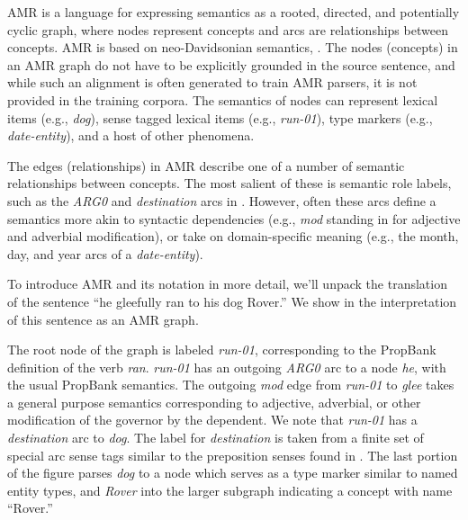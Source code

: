 \documentclass[11pt]{article}
\newcommand\w[1]{\textit{#1}} %
\newcommand\e[1]{\textit{#1}} %
\newcommand\n[1]{\textit{#1}} %
\begin{document}

AMR is a language for expressing semantics as a rooted, directed, and potentially cyclic graph, where nodes represent concepts and arcs are relationships between concepts.
AMR is based on neo-Davidsonian semantics, \cite{Davidson:1967,Parsons:1990}.
The nodes (concepts) in an AMR graph do not have to be explicitly grounded in the source sentence, 
and while such an alignment is often generated to train AMR parsers, it is not provided in the training corpora.
The semantics of nodes can represent lexical items (e.g., \w{dog}), sense tagged lexical items (e.g., \textit{run-01}), type markers (e.g., \textit{date-entity}), and a host of other phenomena.

The edges (relationships) in AMR describe one of a number of semantic relationships between concepts.
The most salient of these is semantic role labels, such as the \w{ARG0} and \w{destination} arcs in .
However, often these arcs define a semantics more akin to syntactic dependencies (e.g., \textit{mod} standing in for adjective and adverbial modification), or take on domain-specific meaning (e.g., the month, day, and year arcs of a \textit{date-entity}).

To introduce AMR and its notation in more detail, we'll unpack the translation of the sentence ``he gleefully ran to his dog Rover.'' 
We show in  the interpretation of this sentence as an AMR graph.


The root node of the graph is labeled \n{run-01}, corresponding to the PropBank \cite{palmer2005proposition-srl} definition of the verb \w{ran}.
\w{run-01} has an outgoing \e{ARG0} arc to a node \w{he}, with the usual PropBank semantics.
The outgoing \e{mod} edge from \n{run-01} to \n{glee} takes a general purpose semantics corresponding to adjective, adverbial, or other modification of the governor by the dependent.
We note that \n{run-01} has a \e{destination} arc to \n{dog}.
The label for \e{destination} is taken from a finite set of special arc sense tags similar to the preposition senses found in \cite{srikumar2013-srl}.
The last portion of the figure parses \w{dog} to a node which serves as a type marker similar to named entity
types, and \w{Rover} into the larger subgraph indicating a concept with name ``Rover.''
\end{document}
